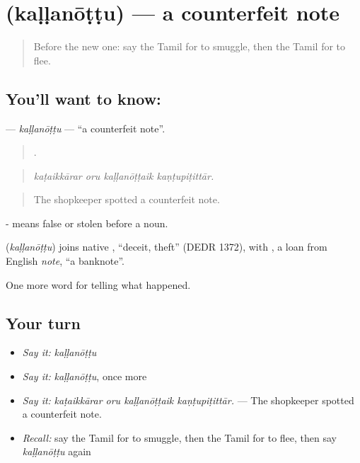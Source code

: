 \section[\texorpdfstring{\ta{கள்ளநோட்டு} (kaḷḷanōṭṭu)}{கள்ளநோட்டு (kaḷḷanōṭṭu)}]{ (kaḷḷanōṭṭu) — a counterfeit note}

\label{lesson:TA-C297-kallanottu}



\begin{quote}
Before the new one: say the Tamil for to smuggle, then the Tamil for to flee.
\end{quote}

\subsection*{You'll want to know: }
\textbf{} — \emph{kaḷḷanōṭṭu} — \textquotedblleft{}a counterfeit note\textquotedblright{}.

\begin{quote}
   .
\end{quote}

\begin{quote}
\emph{kaṭaikkārar oru kaḷḷanōṭṭaik kaṇṭupiṭittār.}
\end{quote}

\begin{quote}
The shopkeeper spotted a counterfeit note.
\end{quote}

- means false or stolen before a noun.

\begin{cousinweb}
\textbf{} (\emph{kaḷḷanōṭṭu}) joins native , \textquotedblleft{}deceit, theft\textquotedblright{} (DEDR 1372), with , a loan from English \emph{note}, \textquotedblleft{}a banknote\textquotedblright{}.
\end{cousinweb}

\begin{grammarlens}[title={What you've built}]
One more word for telling what happened.
\end{grammarlens}

\subsection*{Your turn}
\begin{itemize}
\raggedright
  \item \emph{Say it:} \emph{kaḷḷanōṭṭu}
  \item \emph{Say it:} \emph{kaḷḷanōṭṭu}, once more
  \item \emph{Say it:} \emph{kaṭaikkārar oru kaḷḷanōṭṭaik kaṇṭupiṭittār.} — The shopkeeper spotted a counterfeit note.
  \item \emph{Recall:} say the Tamil for to smuggle, then the Tamil for to flee, then say \emph{kaḷḷanōṭṭu} again
\end{itemize}


